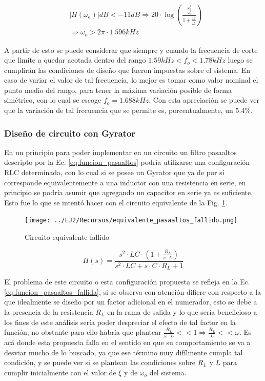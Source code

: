 \begin{eqnarray*}
    & |H(\omega_a)|dB < -11dB \Rightarrow 20 \cdot \log{ \left(  \frac{\frac{\omega_a^{2}}{\omega_o^{2}}}{1 + \frac{\omega_a^{2}}{\omega_o^{2}}} \right) } \\
    & \Rightarrow \omega_o > 2\pi \cdot 1.596kHz
\end{eqnarray*}

A partir de esto se puede considerar que siempre y cuando la frecuencia de corte que limite a quedar acotada dentro del rango $1.59kHz < f_o < 1.78kHz$ luego se cumplir\'an
las condiciones de dise\~no que fueron impuestas sobre el sistema. En caso de variar el valor de tal frecuencia, lo mejor es tomar como valor nominal el punto medio del rango, para tener la m\'axima
variaci\'on posible de forma sim\'etrico, con lo cual se escoge $f_o = 1.688kHz$. Con esta apreciaci\'on se puede ver que la variaci\'on de tal frecuencia que se permite es, porcentualmente,
un $5.4\%$.

\subsubsection{Dise\~no de circuito con Gyrator}

En un principio para poder implementar en un circuito un filtro pasaaltos descripto por la Ec. \ref{eq:funcion_pasaaltos} podr\'ia utilizarse una configuraci\'on RLC determinada,
con lo cual si se posee un Gyrator que ya de por s\'i corresponde equivalentemente a una inductor con una resistencia en serie, en principio se podr\'ia asumir que agregando un capacitor en serie ya es suficiente.
Esto fue lo que se intent\'o hacer con el circuito equivalente de la Fig. \ref{fig:equivalente_pasaaltos_fallido}.

\begin{figure}[H]
    \centering
    \texttt{[image: ../EJ2/Recursos/equivalente\_pasaaltos\_fallido.png]}
    \caption{Circuito equivalente fallido}
    \label{fig:equivalente_pasaaltos_fallido}
\end{figure}

\begin{equation*}
    H(s) = \frac{s^{2} \cdot LC \cdot (1 + \frac{R_L}{s \cdot L})}{s^{2} \cdot LC + s \cdot C \cdot R_L + 1}
    \label{eq:funcion_pasaaltos_fallida}
\end{equation*}

El problema de este circuito o esta configuraci\'on propuesta se refleja en la Ec. \ref{eq:funcion_pasaaltos_fallida}, si se observa con atenci\'on difiere con respecto a la que idealmente se dise\~no por un factor
adicional en el numerador, esto se debe a la presencia de la resistencia $R_L$ en la rama de salida y lo que ser\'ia beneficioso a los fines de este an\'alisis ser\'ia poder despreciar el efecto de tal factor en la funci\'on, no obstante para ello
habr\'ia que plantear $\frac{R_L}{\omega \cdot L} << 1 \Rightarrow \frac{R_L}{L} << \omega$. Es ac\'a donde esta propuesta falla en el sentido en que su comportamiento se va a desviar mucho de lo buscado,
ya que ese t\'ermino muy dif\'ilmente cumpla tal condici\'on, y se puede ver si se plantean las condiciones sobre $R_L$ y $L$ para cumplir inicialmente con el valor de $\xi$ y de $\omega_o$ del sistema.


